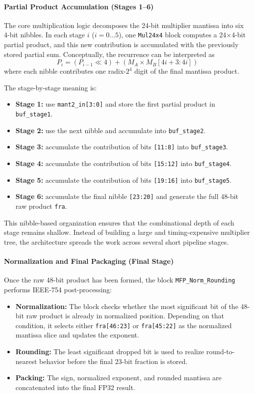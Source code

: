 \paragraph{Partial Product Accumulation (Stages 1--6)}
The core multiplication logic decomposes the 24-bit multiplier mantissa into six 4-bit nibbles. In each stage $i$ ($i = 0 \dots 5$), one \texttt{Mul24x4} block computes a 24$\times$4-bit partial product, and this new contribution is accumulated with the previously stored partial sum. Conceptually, the recurrence can be interpreted as
\begin{equation}
P_i = (P_{i-1} \ll 4) + \left(M_A \times M_B[4i+3:4i]\right)
\end{equation}
where each nibble contributes one radix-$2^4$ digit of the final mantissa product.

The stage-by-stage meaning is:
\begin{itemize}
    \item \textbf{Stage 1:} use \texttt{mant2\_in[3:0]} and store the first partial product in \texttt{buf\_stage1}.
    \item \textbf{Stage 2:} use the next nibble and accumulate into \texttt{buf\_stage2}.
    \item \textbf{Stage 3:} accumulate the contribution of bits \texttt{[11:8]} into \texttt{buf\_stage3}.
    \item \textbf{Stage 4:} accumulate the contribution of bits \texttt{[15:12]} into \texttt{buf\_stage4}.
    \item \textbf{Stage 5:} accumulate the contribution of bits \texttt{[19:16]} into \texttt{buf\_stage5}.
    \item \textbf{Stage 6:} accumulate the final nibble \texttt{[23:20]} and generate the full 48-bit raw product \texttt{fra}.
\end{itemize}

This nibble-based organization ensures that the combinational depth of each stage remains shallow. Instead of building a large and timing-expensive multiplier tree, the architecture spreads the work across several short pipeline stages.

\paragraph{Normalization and Final Packaging (Final Stage)}
Once the raw 48-bit product has been formed, the block \texttt{MFP\_Norm\_Rounding} performs IEEE-754 post-processing:
\begin{itemize}
    \item \textbf{Normalization:} The block checks whether the most significant bit of the 48-bit raw product is already in normalized position. Depending on that condition, it selects either \texttt{fra[46:23]} or \texttt{fra[45:22]} as the normalized mantissa slice and updates the exponent.
    \item \textbf{Rounding:} The least significant dropped bit is used to realize round-to-nearest behavior before the final 23-bit fraction is stored.
    \item \textbf{Packing:} The sign, normalized exponent, and rounded mantissa are concatenated into the final FP32 result.
\end{itemize}

